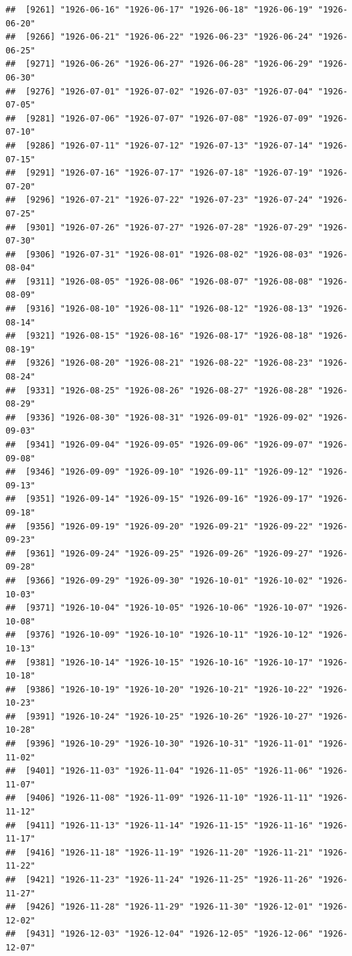 \documentclass{article}\usepackage[]{graphicx}\usepackage[]{color}
\makeatletter
\newenvironment{kframe}{%
 \def\at@end@of@kframe{}%
 \ifinner\ifhmode%
  \def\at@end@of@kframe{\end{minipage}}%
  \begin{minipage}{\columnwidth}%
 \fi\fi%
 \def\FrameCommand##1{\hskip\@totalleftmargin \hskip-\fboxsep
 \colorbox{shadecolor}{##1}\hskip-\fboxsep
     \hskip-\linewidth \hskip-\@totalleftmargin \hskip\columnwidth}%
 \MakeFramed {\advance\hsize-\width
   \@totalleftmargin\z@ \linewidth\hsize
   \@setminipage}}%
 {\par\unskip\endMakeFramed%
 \at@end@of@kframe}
\newenvironment{knitrout}{}{} %
\makeatother
\begin{document}
\begin{description}
\begin{knitrout}
\begin{kframe}
\begin{verbatim}
##  [9261] "1926-06-16" "1926-06-17" "1926-06-18" "1926-06-19" "1926-06-20"
##  [9266] "1926-06-21" "1926-06-22" "1926-06-23" "1926-06-24" "1926-06-25"
##  [9271] "1926-06-26" "1926-06-27" "1926-06-28" "1926-06-29" "1926-06-30"
##  [9276] "1926-07-01" "1926-07-02" "1926-07-03" "1926-07-04" "1926-07-05"
##  [9281] "1926-07-06" "1926-07-07" "1926-07-08" "1926-07-09" "1926-07-10"
##  [9286] "1926-07-11" "1926-07-12" "1926-07-13" "1926-07-14" "1926-07-15"
##  [9291] "1926-07-16" "1926-07-17" "1926-07-18" "1926-07-19" "1926-07-20"
##  [9296] "1926-07-21" "1926-07-22" "1926-07-23" "1926-07-24" "1926-07-25"
##  [9301] "1926-07-26" "1926-07-27" "1926-07-28" "1926-07-29" "1926-07-30"
##  [9306] "1926-07-31" "1926-08-01" "1926-08-02" "1926-08-03" "1926-08-04"
##  [9311] "1926-08-05" "1926-08-06" "1926-08-07" "1926-08-08" "1926-08-09"
##  [9316] "1926-08-10" "1926-08-11" "1926-08-12" "1926-08-13" "1926-08-14"
##  [9321] "1926-08-15" "1926-08-16" "1926-08-17" "1926-08-18" "1926-08-19"
##  [9326] "1926-08-20" "1926-08-21" "1926-08-22" "1926-08-23" "1926-08-24"
##  [9331] "1926-08-25" "1926-08-26" "1926-08-27" "1926-08-28" "1926-08-29"
##  [9336] "1926-08-30" "1926-08-31" "1926-09-01" "1926-09-02" "1926-09-03"
##  [9341] "1926-09-04" "1926-09-05" "1926-09-06" "1926-09-07" "1926-09-08"
##  [9346] "1926-09-09" "1926-09-10" "1926-09-11" "1926-09-12" "1926-09-13"
##  [9351] "1926-09-14" "1926-09-15" "1926-09-16" "1926-09-17" "1926-09-18"
##  [9356] "1926-09-19" "1926-09-20" "1926-09-21" "1926-09-22" "1926-09-23"
##  [9361] "1926-09-24" "1926-09-25" "1926-09-26" "1926-09-27" "1926-09-28"
##  [9366] "1926-09-29" "1926-09-30" "1926-10-01" "1926-10-02" "1926-10-03"
##  [9371] "1926-10-04" "1926-10-05" "1926-10-06" "1926-10-07" "1926-10-08"
##  [9376] "1926-10-09" "1926-10-10" "1926-10-11" "1926-10-12" "1926-10-13"
##  [9381] "1926-10-14" "1926-10-15" "1926-10-16" "1926-10-17" "1926-10-18"
##  [9386] "1926-10-19" "1926-10-20" "1926-10-21" "1926-10-22" "1926-10-23"
##  [9391] "1926-10-24" "1926-10-25" "1926-10-26" "1926-10-27" "1926-10-28"
##  [9396] "1926-10-29" "1926-10-30" "1926-10-31" "1926-11-01" "1926-11-02"
##  [9401] "1926-11-03" "1926-11-04" "1926-11-05" "1926-11-06" "1926-11-07"
##  [9406] "1926-11-08" "1926-11-09" "1926-11-10" "1926-11-11" "1926-11-12"
##  [9411] "1926-11-13" "1926-11-14" "1926-11-15" "1926-11-16" "1926-11-17"
##  [9416] "1926-11-18" "1926-11-19" "1926-11-20" "1926-11-21" "1926-11-22"
##  [9421] "1926-11-23" "1926-11-24" "1926-11-25" "1926-11-26" "1926-11-27"
##  [9426] "1926-11-28" "1926-11-29" "1926-11-30" "1926-12-01" "1926-12-02"
##  [9431] "1926-12-03" "1926-12-04" "1926-12-05" "1926-12-06" "1926-12-07"

\end{verbatim}
\end{kframe}
\end{knitrout}
\end{description}
\end{document}
